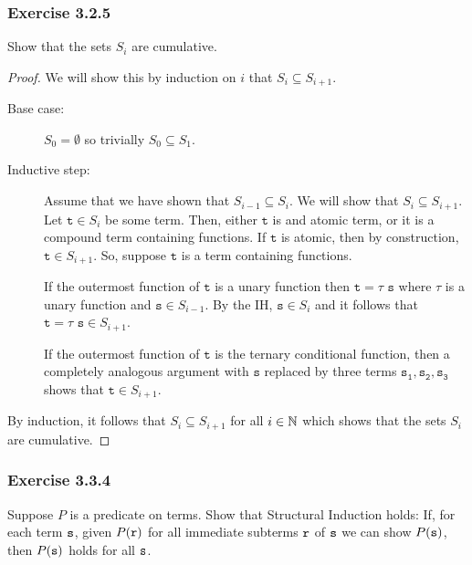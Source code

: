 \subsubsection*{Exercise 3.2.5}
Show that the sets $S_i$ are cumulative.
\begin{proof} We will show this by induction on $i$ that $S_i \subseteq S_{i+1}$.
\begin{description}
    \item[Base case:] $S_0 = \emptyset$ so trivially $S_0 \subseteq S_1$.
    \item[Inductive step:] Assume that we have shown that $S_{i-1} \subseteq S_i$.  We will show that
        $S_i \subseteq S_{i+1}$.  Let $\mathtt{t} \in S_i$ be some term.  Then, either $\mathtt{t}$ is and
        atomic term, or it is a compound term containing functions.  If $\mathtt{t}$ is atomic, then by 
        construction, $\mathtt{t} \in S_{i+1}$.  So, suppose $\mathtt{t}$ is a term containing functions.
        
        If the outermost function of $\mathtt{t}$ is a unary function then $\mathtt{t} = \tau\,\, \mathtt{s}$ where $\tau$ is a unary function and $\mathtt{s} \in S_{i-1}$.  By the IH, $\mathtt{s} \in S_i$ 
and it follows that $\mathtt{t} = \tau\,\, \mathtt{s} \in S_{i+1}$.

If the outermost function of $\mathtt{t}$ is the ternary conditional function, then a completely analogous
argument with $\mathtt{s}$ replaced by three terms $\mathtt{s_1}, \mathtt{s_2}, \mathtt{s_3}$ shows that
$\mathtt{t} \in S_{i+1}$.
\end{description}
By induction, it follows that $S_i \subseteq S_{i+1}$ for all $i \in \mathbb{N}$ which shows that the sets
$S_i$ are cumulative.
\end{proof}

\subsubsection*{Exercise 3.3.4}
Suppose $P$ is a predicate on terms.  Show that Structural Induction holds:\newline
If, for each term $\mathtt{s}$, given $P(\mathtt{r})$ for all immediate subterms $\mathtt{r}$ of $\mathtt{s}$
we can show $P(\mathtt{s})$, then $P(\mathtt{s})$ holds for all $\mathtt{s}$.

